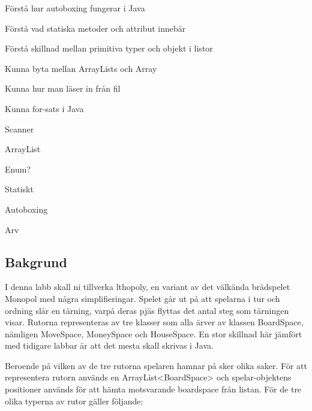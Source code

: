 

\Lab{\LabWeekELEVEN}

\begin{Goals}
\item Förstå hur autoboxing fungerar i Java
\item Förstå vad statiska metoder och attribut innebär
\item Förstå skillnad mellan primitiva typer och objekt i listor
\item Kunna byta mellan ArrayLists och Array
\item Kunna hur man läser in från fil
\item Kunna for-sats i Java
\end{Goals}

\begin{Preparations}
\item Scanner
\item ArrayList
\item Enum?
\item Statiskt
\item Autoboxing
\item Arv
\end{Preparations}

\subsection{Bakgrund}
I denna labb skall ni tillverka lthopoly, en variant av det välkända brädspelet Monopol med några simplifieringar. Spelet går ut på att spelarna i tur och ordning slår en tärning, varpå deras pjäs flyttas det antal steg som tärningen visar. Rutorna representeras av tre klasser som alla ärver av klassen BoardSpace, nämligen MoveSpace, MoneySpace och HouseSpace. En stor skillnad här jämfört med tidigare labbar är att det mesta skall skrivas i Java.

Beroende på vilken av de tre rutorna spelaren hamnar på sker olika saker. För att representera rutorn används en ArrayList<BoardSpace> och spelar-objektens positioner används för att hämta motsvarande boardspace från listan. För de tre olika typerna av rutor gäller följande:


